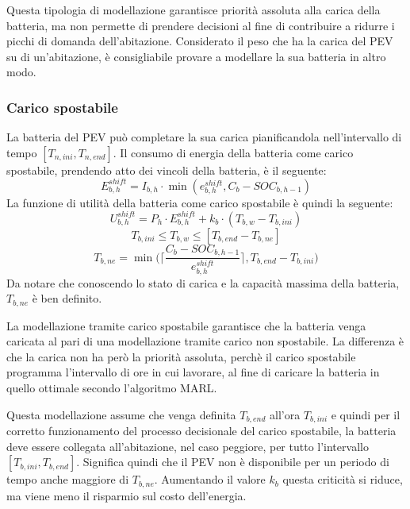\documentclass[italian, Lau, oneside]{sapthesis}
\begin{document}
Questa tipologia di modellazione garantisce priorità assoluta alla carica della batteria, ma non permette di prendere decisioni al fine di contribuire a ridurre i picchi di domanda dell'abitazione. Considerato il peso che ha la carica del PEV su di un'abitazione, è consigliabile provare a modellare la sua batteria in altro modo. 

\subsubsection{Carico spostabile}
La batteria del PEV può completare la sua carica pianificandola nell'intervallo di tempo $[T_{n,ini}, T_{n,end}]$. Il consumo di energia della batteria come carico spostabile, prendendo atto dei vincoli della batteria, è il seguente:
\begin{equation}
E^{shift}_{b,h} = I_{b,h} \cdot \min(e^{shift}_{b,h}, C_b - SOC_{b,h-1})
\end{equation}
La funzione di utilità della batteria come carico spostabile è quindi la seguente:
\begin{equation}
    U^{shift}_{b,h} = P_h \cdot E^{shift}_{b,h}+k_b \cdot (T_{b,w}-T_{b,ini})
\end{equation}
\begin{equation}
    T_{b,ini} \leq T_{b,w} \leq [T_{b,end}-T_{b,ne}]
\end{equation}
\begin{equation}
    T_{b,ne} = \min \Bigg( \Bigg \lceil \frac{C_b - SOC_{b,h-1}}{e^{shift}_{b,h}} \Bigg \rceil, T_{b,end}-T_{b,ini} \Bigg)
\end{equation}
Da notare che conoscendo lo stato di carica e la capacità massima della batteria, $T_{b,ne}$ è ben definito. 

La modellazione tramite carico spostabile garantisce che la batteria venga caricata al pari di una modellazione tramite carico non spostabile. La differenza è che la carica non ha però la priorità assoluta, perchè il carico spostabile programma l'intervallo di ore in cui lavorare, al fine di caricare la batteria in quello ottimale secondo l'algoritmo MARL.

Questa modellazione assume che venga definita $T_{b,end}$ all'ora $T_{b,ini}$ e quindi per il corretto funzionamento del processo decisionale del carico spostabile, la batteria deve essere collegata all'abitazione, nel caso peggiore, per tutto l'intervallo $[T_{b,ini}, T_{b,end}]$. Significa quindi che il PEV non è disponibile per un periodo di tempo anche maggiore di $T_{b,ne}$. Aumentando il valore $k_b$ questa criticità si riduce, ma viene meno il risparmio sul costo dell'energia.
\end{document}
